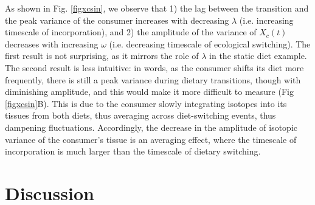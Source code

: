 \documentclass{frontiersSCNS}
\begin{document}
As shown in Fig. \ref{figxcsin}, we observe that
1) the lag between the transition and the peak variance of the consumer increases with decreasing $\lambda$ (i.e. increasing timescale of incorporation), and
2) the amplitude of the variance of $X_c(t)$ decreases with increasing $\omega$ (i.e. decreasing timescale of ecological switching).
The first result is not surprising, as it mirrors the role of $\lambda$ in the static diet example. %
The second result is less intuitive: in words, as the consumer shifts its diet more frequently, there is still a peak variance during dietary transitions, though with diminishing amplitude, and this would make it more difficult to measure (Fig \ref{figxcsin}B).
This is due to the consumer slowly integrating isotopes into its tissues from both diets, thus averaging across diet-switching events, thus dampening fluctuations.
Accordingly, the decrease in the amplitude of isotopic variance of the consumer's tissue is an averaging effect, where the timescale of incorporation is much larger than the timescale of dietary switching.





\section{Discussion}

\end{document}
